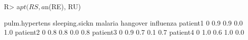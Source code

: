 \begin{Schunk}
% --begin: "comp.circ.excl.unavoid"
\begin{Sinput}
R> a$pt(RS, a$n(RE), RU)
\end{Sinput}
\begin{Soutput}
         pulm.hypertens sleeping.sickn malaria hangover influenza
patient1              0            0.9     0.9      0.0       1.0
patient2              0            0.8     0.8      0.0       0.8
patient3              0            0.9     0.7      0.1       0.7
patient4              0            1.0     0.6      1.0       0.0
\end{Soutput}
%
% --end: "comp.circ.excl.unavoid"
\end{Schunk}
